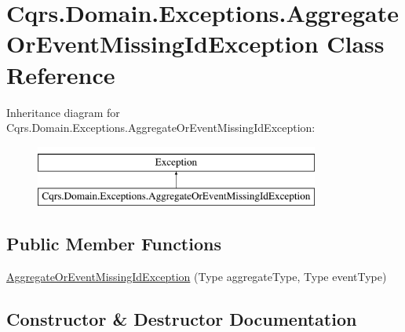 \hypertarget{classCqrs_1_1Domain_1_1Exceptions_1_1AggregateOrEventMissingIdException}{}\section{Cqrs.\+Domain.\+Exceptions.\+Aggregate\+Or\+Event\+Missing\+Id\+Exception Class Reference}
\label{classCqrs_1_1Domain_1_1Exceptions_1_1AggregateOrEventMissingIdException}
Inheritance diagram for Cqrs.\+Domain.\+Exceptions.\+Aggregate\+Or\+Event\+Missing\+Id\+Exception\+:\begin{figure}[H]
\begin{center}
\leavevmode
\includegraphics[height=2.000000cm]{classCqrs_1_1Domain_1_1Exceptions_1_1AggregateOrEventMissingIdException}
\end{center}
\end{figure}
\subsection*{Public Member Functions}
\begin{DoxyCompactItemize}
\item 
\hyperlink{classCqrs_1_1Domain_1_1Exceptions_1_1AggregateOrEventMissingIdException_ac63e413557df17ed490a8b787e17d960}{Aggregate\+Or\+Event\+Missing\+Id\+Exception} (Type aggregate\+Type, Type event\+Type)
\end{DoxyCompactItemize}


\subsection{Constructor \& Destructor Documentation}
\mbox{\label{classCqrs_1_1Domain_1_1Exceptions_1_1AggregateOrEventMissingIdException_ac63e413557df17ed490a8b787e17d960}} 
